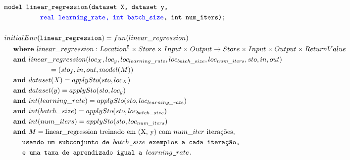 \documentclass[12pt]{article}
\newcommand{\blu}{\textcolor{blue}}
\begin{document}
\begin{align*}
	&\texttt{model linear\_regression(dataset X, dataset y,} \\ 
	&\hspace{12ex}\texttt{\blu{real learning\_rate, int batch\_size},  int num\_iters);} \\
	\\
&initialEnv(\texttt{linear\_regression}) = fun(linear\_regression) \\
&\hspace{3ex}\textbf{where } linear\_regression:Location^5\times Store\times Input\times Output\rightarrow Store\times Input\times Output\times ReturnValue \\
&\hspace{3ex}\textbf{and } linear\_regression(loc_{X}, loc_{y},loc_{learning\_rate},
loc_{batch\_size},  loc_{num\_iters},sto,in,out) \\
&\hspace{15ex}= (sto_f,in,out,model(M))\\
&\hspace{3ex}\textbf{and } dataset(X) = applySto(sto, loc_{X}) \\
&\hspace{3ex}\textbf{and } dataset(y) = applySto(sto, loc_{y}) \\
&\hspace{3ex}\textbf{and } int(learning\_rate) = applySto(sto, loc_{learning\_rate}) \\
&\hspace{3ex}\textbf{and } int(batch\_size) = applySto(sto, loc_{batch\_size}) \\
&\hspace{3ex}\textbf{and } int(num\_iters) = applySto(sto, loc_{num\_iters}) \\
&\hspace{3ex}\textbf{and } M = \text{linear\_regression treinado em (X, y) com $num\_iter$ iterações,} \\ &\hspace{6ex}\texttt{usando um subconjunto de $batch\_size$ exemplos a cada iteração,} \\ 
&\hspace{6ex}\texttt{e uma taxa de aprendizado igual a $learning\_rate$.}  \\
\end{align*}
\end{document}
